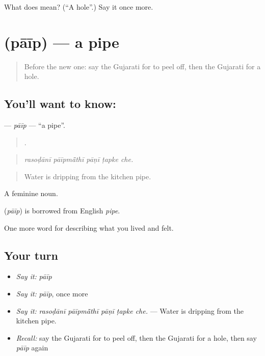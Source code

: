 \begin{tcolorbox}[breakable,colback=teal!4,colframe=teal!35!black,title={Before you move on}]
What does  mean? (\textquotedblleft{}A hole\textquotedblright{}.) Say it once more.
\end{tcolorbox}
\section[\texorpdfstring{\gu{પાઈપ} (pāīp)}{પાઈપ (pāīp)}]{ (pāīp) — a pipe}

\label{lesson:GU-C515-paip}



\begin{quote}
Before the new one: say the Gujarati for to peel off, then the Gujarati for a hole.
\end{quote}

\subsection*{You'll want to know: }
\textbf{} — \emph{pāīp} — \textquotedblleft{}a pipe\textquotedblright{}.

\begin{quote}
    .
\end{quote}

\begin{quote}
\emph{rasoḍānī pāīpmā̃thī pāṇī ṭapke che.}
\end{quote}

\begin{quote}
Water is dripping from the kitchen pipe.
\end{quote}

A feminine noun.

\begin{cousinweb}
\textbf{} (\emph{pāīp}) is borrowed from English \emph{pipe}.
\end{cousinweb}

\begin{grammarlens}[title={What you've built}]
One more word for describing what you lived and felt.
\end{grammarlens}

\subsection*{Your turn}
\begin{itemize}
\raggedright
  \item \emph{Say it:} \emph{pāīp}
  \item \emph{Say it:} \emph{pāīp}, once more
  \item \emph{Say it:} \emph{rasoḍānī pāīpmā̃thī pāṇī ṭapke che.} — Water is dripping from the kitchen pipe.
  \item \emph{Recall:} say the Gujarati for to peel off, then the Gujarati for a hole, then say \emph{pāīp} again
\end{itemize}

